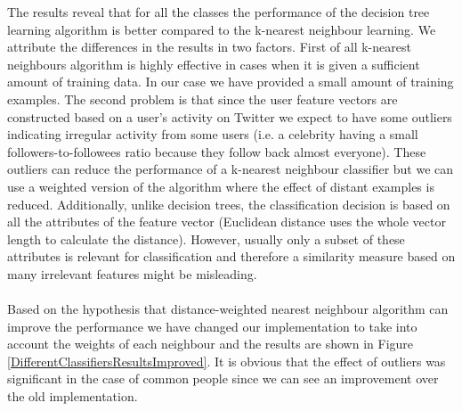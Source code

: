 The results reveal that for all the classes the performance of the decision tree learning algorithm is better compared to the k-nearest neighbour learning. We attribute the differences in the results in two factors. First of all k-nearest neighbours algorithm is highly effective in cases when it is given a sufficient amount of training data. In our case we have provided a small amount of training examples. The second problem is that since the user feature vectors are constructed based on a user's activity on Twitter we expect to have some outliers indicating irregular activity from some users (i.e. a celebrity having a small followers-to-followees ratio because they follow back almost everyone). These outliers can reduce the performance of a k-nearest neighbour classifier but we can use a weighted version of the algorithm where the effect of distant examples is reduced. Additionally, unlike decision trees, the classification decision is based on all the attributes of the feature vector (Euclidean distance uses the whole vector length to calculate the distance). However, usually only a subset of these attributes is relevant for classification and therefore a similarity measure based on many irrelevant features might be misleading.\\\\ 
Based on the hypothesis that distance-weighted nearest neighbour algorithm can improve the performance we have changed our implementation to take into account the weights of each neighbour and the results are shown in Figure \ref{DifferentClassifiersResultsImproved}. It is obvious that the effect of outliers was significant in the case of common people since we can see an improvement over the old implementation.\\\\
